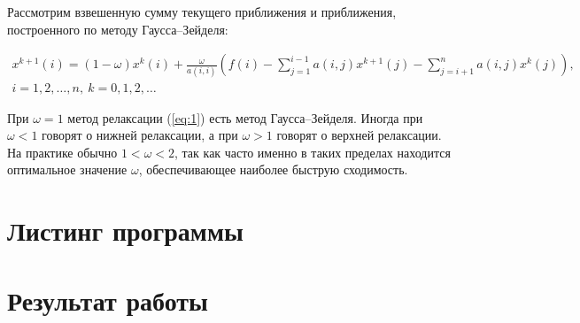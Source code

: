 \documentclass[12pt, a4paper]{report}
\begin{document}
Рассмотрим взвешенную сумму текущего приближения и приближения,
построенного по методу Гаусса–Зейделя:

\begin{multline}
	x^{k+1}(i) = (1-\omega) x^k(i) + \frac{\omega}{a(i,i)} \left( f(i) - \sum_{j=1}^{i-1} a(i,j) x^{k+1}(j) - \sum_{j=i+1}^{n} a(i, j) x^k(j) \right), \\ i = 1, 2, \dots, n, \: k = 0, 1, 2, \dots
	\label {eq:1}
\end{multline}

При $\omega = 1$ метод релаксации (\ref{eq:1}) есть метод Гаусса–Зейделя. Иногда при
$\omega < 1$ говорят о нижней релаксации, а при $\omega > 1$ говорят о верхней релаксации.
На практике обычно $1 < \omega < 2$, так как часто именно в таких пределах
находится оптимальное значение $\omega$, обеспечивающее наиболее быструю
сходимость.



\section{Листинг программы}



\section{Результат работы}
\end{document}
